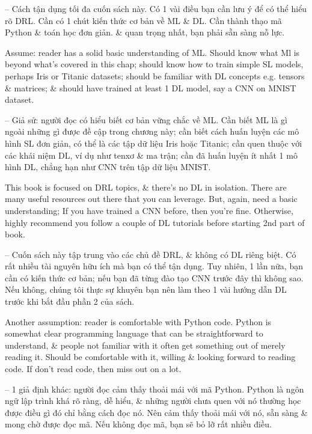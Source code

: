 \documentclass{article}
\begin{document}
\begin{itemize}
\begin{itemize}
\begin{itemize}
            -- {\sf Cách tận dụng tối đa cuốn sách này.} Có 1 vài điều bạn cần lưu ý để có thể hiểu rõ DRL. Cần có 1 chút kiến thức cơ bản về ML \& DL. Cần thành thạo mã Python \& toán học đơn giản. \& quan trọng nhất, bạn phải sẵn sàng nỗ lực.

            Assume: reader has a solid basic understanding of ML. Should know what Ml is beyond what's covered in this chap; should know how to train simple SL models, perhaps Iris or Titanic datasets; should be familiar with DL concepts e.g. tensors \& matrices; \& should have trained at least 1 DL model, say a CNN on MNIST dataset.

            -- Giả sử: người đọc có hiểu biết cơ bản vững chắc về ML. Cần biết ML là gì ngoài những gì được đề cập trong chương này; cần biết cách huấn luyện các mô hình SL đơn giản, có thể là các tập dữ liệu Iris hoặc Titanic; cần quen thuộc với các khái niệm DL, ví dụ như tenxơ \& ma trận; cần đã huấn luyện ít nhất 1 mô hình DL, chẳng hạn như CNN trên tập dữ liệu MNIST.

            This book is focused on DRL topics, \& there's no DL in isolation. There are many useful resources out there that you can leverage. But, again, need a basic understanding; If you have trained a CNN before, then you're fine. Otherwise, highly recommend you follow a couple of DL tutorials before starting 2nd part of book.

            -- Cuốn sách này tập trung vào các chủ đề DRL, \& không có DL riêng biệt. Có rất nhiều tài nguyên hữu ích mà bạn có thể tận dụng. Tuy nhiên, 1 lần nữa, bạn cần có kiến thức cơ bản; nếu bạn đã từng đào tạo CNN trước đây thì không sao. Nếu không, chúng tôi thực sự khuyên bạn nên làm theo 1 vài hướng dẫn DL trước khi bắt đầu phần 2 của sách.

            Another assumption: reader is comfortable with Python code. Python is somewhat clear programming language that can be straightforward to understand, \& people not familiar with it often get something out of merely reading it. Should be comfortable with it, willing \& looking forward to reading code. If don't read code, then miss out on a lot.

            -- 1 giả định khác: người đọc cảm thấy thoải mái với mã Python. Python là ngôn ngữ lập trình khá rõ ràng, dễ hiểu, \& những người chưa quen với nó thường học được điều gì đó chỉ bằng cách đọc nó. Nên cảm thấy thoải mái với nó, sẵn sàng \& mong chờ được đọc mã. Nếu không đọc mã, bạn sẽ bỏ lỡ rất nhiều điều.


\end{itemize}
\end{itemize}
\end{itemize}
\end{document}
